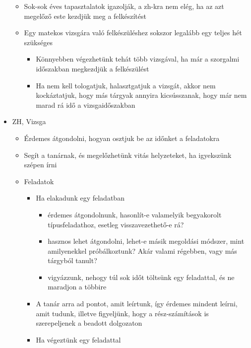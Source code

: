 \documentclass[../Main.tex]{subfiles}
\begin{document}
\begin{itemize}
\begin{itemize}
\begin{itemize}
        \end{itemize}
        \item Sok-sok éves tapasztalatok igazolják, a zh-kra nem elég, ha az azt megelőző
        este kezdjük meg a felkészítést
        \item Egy matekos vizsgára való felkészüléshez sokszor legalább egy teljes hét
        szükséges
        \begin{itemize}
            \item Könnyebben végezhetünk tehát több vizsgával, ha már a szorgalmi
            időszakban megkezdjük a felkészülést
            \item Ha nem kell tologatjuk, halasztgatjuk a vizsgát, akkor nem
            kockáztatjuk, hogy más tárgyak annyira kicsússzanak, hogy már nem
            marad rá idő a vizsgaidőszakban
        \end{itemize}
    \end{itemize}
    \item ZH, Vizsga
    \begin{itemize}
        \item Érdemes átgondolni, hogyan osztjuk be az időnket a feladatokra
        \item Segít a tanárnak, és megelőzhetünk vitás helyzeteket, ha igyekszünk szépen
        írni
        \item Feladatok
        \begin{itemize}
            \item Ha elakadunk egy feladatban
            \begin{itemize}
                \item érdemes átgondolnunk, hasonlít-e valamelyik begyakorolt típusfeladathoz, \newline esetleg visszavezethető-e rá?
                \item hasznos lehet átgondolni, lehet-e másik megoldási módszer,
                mint amilyenekkel próbálkoztunk? Akár valami régebben, vagy
                más tárgyból tanult?
                \item vigyázzunk, nehogy túl sok időt töltsünk egy feladattal, és ne
                maradjon a többire
            \end{itemize}
            \item A tanár arra ad pontot, amit leírtunk, így érdemes mindent leírni, amit
            tudunk, illetve figyeljünk, hogy a rész-számítások is szerepeljenek a
            beadott dolgozaton
            \item Ha végeztünk egy feladattal

\end{itemize}
\end{itemize}
\end{itemize}
\end{document}
